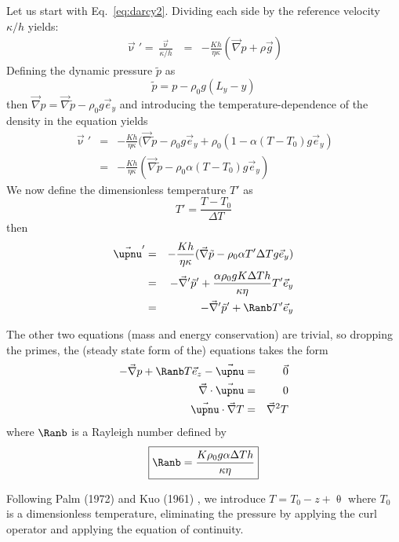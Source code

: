 Let us start with Eq.~\eqref{eq:darcy2}. Dividing each side by
the reference velocity $\kappa/h$ yields:
\begin{eqnarray}
\vec{\upnu}'=\frac{\vec{\upnu}}{\kappa/h}
&=&
-\frac{K h}{\eta \kappa} (\vec\nabla p + \rho \vec{g}) 
\end{eqnarray}
Defining the dynamic pressure $\tilde{p}$ as 
\[
\tilde{p} = p-\rho_0 g (L_y-y)
\]
then $\vec\nabla p = \vec \nabla \tilde{p} - \rho_0 g \vec{e}_y$ and introducing the temperature-dependence of the density in the equation yields
\begin{eqnarray}
\vec{\upnu}'
&=&
-\frac{K h}{\eta \kappa} (\vec\nabla \tilde{p} - \rho_0 g \vec{e}_y + \rho_0(1-\alpha(T-T_0) g  \vec{e}_y)  \\
&=&
-\frac{K h}{\eta \kappa} (\vec\nabla \tilde{p}  -\rho_0\alpha(T-T_0) g \vec{e}_y) 
\end{eqnarray}
We now define the dimensionless temperature $T'$ as
\[
T'= \frac{T-T_0}{\Delta T}
\]
then 
\begin{eqnarray}
\vec{\upnu}'
&=&
-\frac{K h}{\eta \kappa} (\vec\nabla \tilde{p}  -\rho_0\alpha T' \Delta T g \vec{e}_y)  \\
&=& - \vec\nabla' \tilde{p}' + \frac{\alpha \rho_0 g K \Delta T h}{\kappa \eta } T' \vec{e}_y  \\
&=& - \vec\nabla' \tilde{p}' + \Ranb T' \vec{e}_y
\end{eqnarray}

The other two equations (mass and energy conservation) are trivial, so dropping the primes, 
the (steady state form of the) equations takes the form
\begin{eqnarray}
-\vec\nabla p + \Ranb T \vec{e}_z - \vec{\upnu} &=& \vec{0} \\
\vec\nabla\cdot \vec\upnu &=& 0\\
\vec\upnu\cdot\vec\nabla T &=& \vec\nabla^2 T
\end{eqnarray}
where $\Ranb$ is a Rayleigh number defined by
\[
\boxed{
\Ranb = \frac{K \rho_0 g \alpha \Delta T h}{\kappa \eta}
}
\]

Following Palm \etal (1972) \cite{pawk72} and Kuo (1961) \cite{kuo61}, we introduce $T = T_0 - z + \uptheta$ where $T_0$ is a dimensionless temperature, eliminating the pressure by applying the curl operator and applying the equation of continuity.

